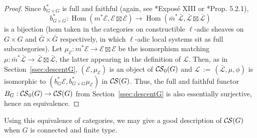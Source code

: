\documentclass[10pt]{amsart}
\theoremstyle{plain}
\theoremstyle{definition}
\theoremstyle{remark}
\DeclareMathOperator{\Hom}{Hom}
\newcommand{\ceq}{{\, :=\, }}
\newcommand{\cs}[1]{{\mathcal{#1}}}
\newcommand{\gcs}[1]{{\mathcal{\bar #1}}}
\newcommand{\CS}{{\mathcal{C\hskip-0.8pt S}}}
\newcommand{\bCS}{{\CS_0}}
\begin{document}
\begin{proof}
  Since $b_{G\times G}^*$ is full and faithful (again, see
\cite{deligne-katz:SGA7.2}*{Expos\'e XIII} or \cite{beilinson-bernstein-deligne:81a}*{Prop. 5.2.1}),
 \[
  b_{G\times G}^* : \Hom(m^*\cs{E},\cs{E}\boxtimes\cs{E}) \to \Hom({\bar m}^*\gcs{L},\gcs{L}\boxtimes\gcs{L})
 \]
  is a bijection
  (hom taken in the categories on constructible $\ell$-adic sheaves on
  $G\times G$ and ${\bar G}\times {\bar G}$ respectively,
  in which $\ell$-adic local systems sit as full subcategories).
  Let $\mu_\cs{E} : m^*\cs{E} \to \cs{E}\boxtimes\cs{E}$ be the isomorphism matching
  $\mu : {\bar m}^*\gcs{L} \to \gcs{L}\boxtimes\gcs{L}$,
  the latter appearing in the definition of $\cs{L}$.
  Then, as in Section~\ref{ssec:descentG}, $(\cs{E},\mu_\cs{E})$ is an object of $\bCS(G)$
  and $\cs{L} \ceq (\gcs{L},\mu,\phi)$ is isomorphic to $(b_G^*\cs{E},b_{G\times G}^*\mu_\cs{E})$ in $\CS(G)$.
  Thus, the full and faithful functor $B_G : \bCS(G) \to \CS(G)$ from Section~\ref{ssec:descentG}
  is also essentially surjective, hence an equivalence.
\end{proof}

Using this equivalence of categories, we may give a good description of $\CS(G)$ when $G$ is connected and finite type.
\end{document}
